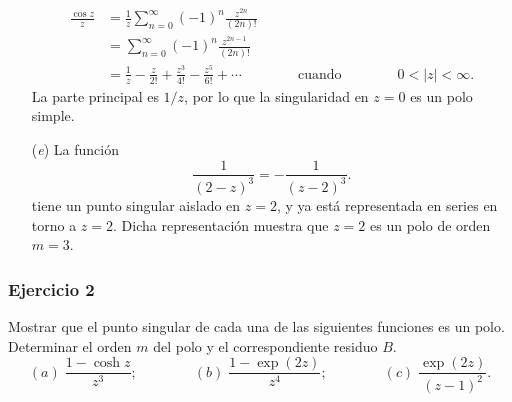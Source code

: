 \documentclass[a4paper]{report}
\begin{document}
\begin{enumerate}
 \begin{align*}
  \frac{\cos z}{z}&=\frac{1}{z}\sum_{n=0}^\infty(-1)^n\frac{z^{2n}}{(2n)!}\\
    &=\sum_{n=0}^\infty(-1)^n\frac{z^{2n-1}}{(2n)!}\\
    &=\frac{1}{z}-\frac{z}{2!}+\frac{z^3}{4!}-\frac{z^5}{6!}+\cdots
 \qquad\qquad\textrm{cuando}\qquad\qquad
 0<|z|<\infty.
 \end{align*}
 La parte principal es \(1/z\), por lo que la singularidad en \(z=0\) es un polo simple.
 \item[(\textit{e})] La función 
 \[
  \frac{1}{(2-z)^3}=-\frac{1}{(z-2)^3}.
 \]
 tiene un punto singular aislado en \(z=2\), y ya está representada en series en torno a \(z=2\). Dicha representación muestra que \(z=2\) es un polo de orden \(m=3\).
\end{enumerate}

\subsubsection*{Ejercicio 2}

Mostrar que el punto singular de cada una de las siguientes funciones es un polo. Determinar el orden \(m\) del polo y el correspondiente residuo \(B\).
\[
 (\textit{a})\;\frac{1-\cosh z}{z^3};\qquad\qquad (\textit{b})\;\frac{1-\exp(2z)}{z^4};\qquad\qquad
 (\textit{c})\;\frac{\exp(2z)}{(z-1)^2}.
\]
\end{document}
